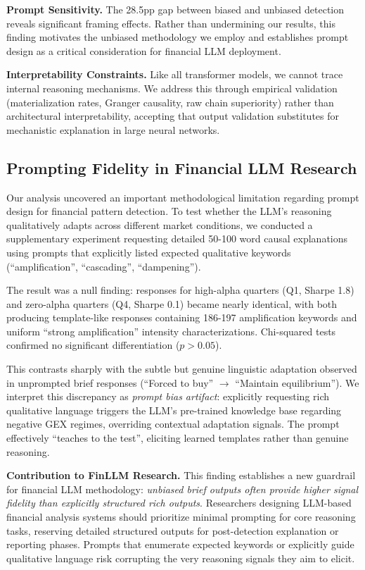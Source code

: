 \textbf{Prompt Sensitivity.} The 28.5pp gap between biased and unbiased detection reveals significant framing effects. Rather than undermining our results, this finding motivates the unbiased methodology we employ and establishes prompt design as a critical consideration for financial LLM deployment.

\textbf{Interpretability Constraints.} Like all transformer models, we cannot trace internal reasoning mechanisms. We address this through empirical validation (materialization rates, Granger causality, raw chain superiority) rather than architectural interpretability, accepting that output validation substitutes for mechanistic explanation in large neural networks.

\subsection{Prompting Fidelity in Financial LLM Research}

Our analysis uncovered an important methodological limitation regarding prompt design for financial pattern detection. To test whether the LLM's reasoning qualitatively adapts across different market conditions, we conducted a supplementary experiment requesting detailed 50-100 word causal explanations using prompts that explicitly listed expected qualitative keywords (``amplification'', ``cascading'', ``dampening'').

The result was a null finding: responses for high-alpha quarters (Q1, Sharpe 1.8) and zero-alpha quarters (Q4, Sharpe 0.1) became nearly identical, with both producing template-like responses containing 186-197 amplification keywords and uniform ``strong amplification'' intensity characterizations. Chi-squared tests confirmed no significant differentiation ($p > 0.05$).

This contrasts sharply with the subtle but genuine linguistic adaptation observed in unprompted brief responses (``Forced to buy'' $\rightarrow$ ``Maintain equilibrium''). We interpret this discrepancy as \textit{prompt bias artifact}: explicitly requesting rich qualitative language triggers the LLM's pre-trained knowledge base regarding negative GEX regimes, overriding contextual adaptation signals. The prompt effectively ``teaches to the test'', eliciting learned templates rather than genuine reasoning.

\textbf{Contribution to FinLLM Research.} This finding establishes a new guardrail for financial LLM methodology: \textit{unbiased brief outputs often provide higher signal fidelity than explicitly structured rich outputs}. Researchers designing LLM-based financial analysis systems should prioritize minimal prompting for core reasoning tasks, reserving detailed structured outputs for post-detection explanation or reporting phases. Prompts that enumerate expected keywords or explicitly guide qualitative language risk corrupting the very reasoning signals they aim to elicit.

